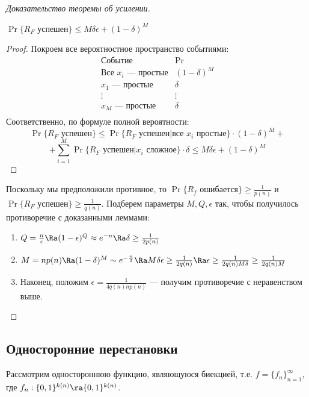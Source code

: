 \begin{proof}[Доказательство теоремы об усилении]
    \begin{lemma}
        \(\Pr\{R_F\text{ успешен}\} \le M\delta\epsilon + (1 - \delta)^M\)
    \end{lemma}
    \begin{proof}
        Покроем все вероятностное пространство событиями:
        \[\begin{array}{c|c}
            \text{Событие} & \Pr \\
            \hline
            \text{Все \(x_i\) --- простые} & (1 - \delta)^M \\
            \hline
            \text{\(x_1\) --- простые} & \delta \\
            \hline
            \vdots & \vdots \\
            \hline
            \text{\(x_M\) --- простые} & \delta \\
        \end{array}\]
        Соответственно, по формуле полной вероятности:
        \[\Pr\{R_F\text{ успешен}\} \le \Pr\{R_F\text{ успешен} | \text{все \(x_i\) простые}\}\cdot (1 - \delta)^M +\]
        \[+ \sum_{i = 1}^M \Pr\{R_F\text{ успешен} | \text{\(x_i\) сложное}\}\cdot \delta \le M\delta\epsilon + (1 - \delta)^M\]
    \end{proof}

    Поскольку мы предположили противное, то \(\Pr\{R_f\text{ ошибается}\} \ge \frac{1}{p(n)}\) и \(\Pr\{R_F\text{ успешен}\} \ge \frac{1}{q(n)}\). Подберем параметры \(M, Q, \epsilon\) так, чтобы получилось противоречие с доказанными леммами:

    \begin{enumerate}
        \item \(Q = \frac{n}{\epsilon} \Ra (1 - \epsilon)^Q \approx e^{-n} \Ra \delta \ge \frac{1}{2p(n)}\)
        \item \(M = np(n) \Ra (1 - \delta)^M \sim e^{-\frac{n}{2}}\Ra M\delta\epsilon \ge \frac{1}{2q(n)} \Ra \epsilon \ge \frac{1}{2q(n)M\delta} \ge \frac{1}{2q(n)M}\)
        \item Наконец, положим \(\epsilon = \frac{1}{4q(n)np(n)}\) --- получим противоречие с неравенством выше.
    \end{enumerate}
\end{proof}

\subsection{Односторонние перестановки}

Рассмотрим одностороннюю функцию, являющуюся биекцией, т.е. \(f = \{f_n\}_{n = 1}^\infty\), где \(f_n: \{0, 1\}^{k(n)} \ra \{0, 1\}^{k(n)}\).

